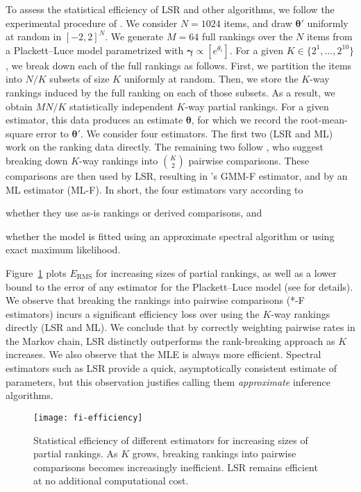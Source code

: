 To assess the statistical efficiency of LSR and other algorithms, we follow the experimental procedure of \citet{hajek2014minimax}.
We consider $N = 1024$ items, and draw $\bm{\theta}'$ uniformly at random in $[-2, 2]^N$.
We generate $M = 64$ full rankings over the $N$ items from a Plackett--Luce model parametrized with $\bm{\gamma} \propto [e^{\theta_i}]$.
For a given $K \in \{2^1, \ldots, 2^{10}\}$, we break down each of the full rankings as follows.
First, we partition the items into $N/K$ subsets of size $K$ uniformly at random.
Then, we store the $K$-way rankings induced by the full ranking on each of those subsets.
As a result, we obtain $MN/K$ statistically independent $K$-way partial rankings.
For a given estimator, this data produces an estimate $\bm{\theta}$, for which we record the root-mean-square error to $\bm{\theta}'$.
We consider four estimators.
The first two (LSR and ML) work on the ranking data directly.
The remaining two follow \citet{azari2013generalized}, who suggest breaking down $K$-way rankings into $\binom{K}{2}$ pairwise comparisons.
These comparisons are then used by LSR, resulting in \citeauthor{azari2013generalized}'s GMM-F estimator, and by an ML estimator (ML-F).
In short, the four estimators vary according to
\begin{enuminline}
\item whether they use as-is rankings or derived comparisons, and
\item whether the model is fitted using an approximate spectral algorithm or using exact maximum likelihood.
\end{enuminline}
Figure~\ref{fi:fig:efficiency} plots $E_{\text{RMS}}$ for increasing sizes of partial rankings, as well as a lower bound to the error of any estimator for the Plackett--Luce model (see \citet{hajek2014minimax} for details).
We observe that breaking the rankings into pairwise comparisons (*-F estimators) incurs a significant efficiency loss over using the $K$-way rankings directly (LSR and ML).
We conclude that by correctly weighting pairwise rates in the Markov chain, LSR distinctly outperforms the rank-breaking approach as $K$ increases.
We also observe that the MLE is always more efficient.
Spectral estimators such as LSR provide a quick, asymptotically consistent estimate of parameters, but this observation justifies calling them \emph{approximate} inference algorithms.


\begin{figure}[ht]
\centering
\texttt{[image: fi-efficiency]}
\caption{
Statistical efficiency of different estimators for increasing sizes of partial rankings.
As $K$ grows, breaking rankings into pairwise comparisons becomes increasingly inefficient.
LSR remains efficient at no additional computational cost.
}
\label{fi:fig:efficiency}
\end{figure}

